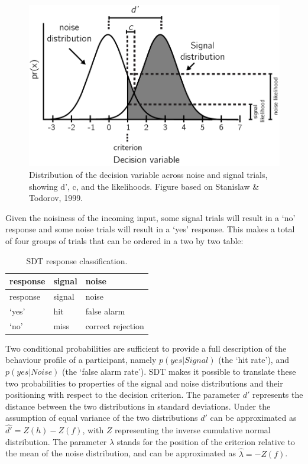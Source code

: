 \documentclass[12pt,twoside]{reedthesis}
\begin{document}
\begin{figure}
\includegraphics[width=0.7\linewidth]{figure/app-SDT/SDT_rep} \caption[Signal Detection Theory]{Distribution of the decision variable across noise and signal trials, showing d', c, and the likelihoods. Figure based on Stanislaw \& Todorov, 1999.}\label{fig:app1-SDT}
\end{figure}
Given the noisiness of the incoming input, some signal trials will result in a `no' response and some noise trials will result in a `yes' response. This makes a total of four groups of trials that can be ordered in a two by two table:
\begin{longtable}[]{@{}lll@{}}
\caption{\label{tab:app1SDT} SDT response classification.}\tabularnewline
\toprule
response & signal & noise \\
\midrule
\endfirsthead
\toprule
response & signal & noise \\
\midrule
\endhead
`yes' & hit & false alarm \\
`no' & miss & correct rejection \\
\bottomrule
\end{longtable}
Two conditional probabilities are sufficient to provide a full description of the behaviour profile of a participant, namely \(p(yes|Signal)\) (the `hit rate'), and \(p(yes|Noise)\) (the `false alarm rate'). SDT makes it possible to translate these two probabilities to properties of the signal and noise distributions and their positioning with respect to the decision criterion. The parameter \(d'\) represents the distance between the two distributions in standard deviations. Under the assumption of equal variance of the two distributions \(d'\) can be approximated as \(\hat{d'}=Z(h)-Z(f)\), with \(Z\) representing the inverse cumulative normal distribution. The parameter \(\lambda\) stands for the position of the criterion relative to the mean of the noise distribution, and can be approximated as \(\hat{\lambda}=-Z(f)\).
\end{document}
